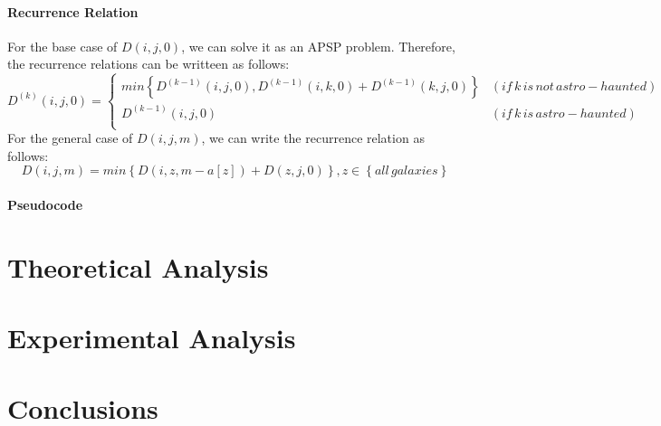 \documentclass{article}
\begin{document}
\paragraph{Recurrence Relation}
For the base case of $D(i,j,0)$, we can solve it as an APSP problem. Therefore, the recurrence relations can be writteen as follows:
$$
D^{\left(k\right)}\left(i,j,0\right) =
\left\{
\begin{aligned}
    min\left\{D^{\left(k-1\right)}\left(i,j,0\right),D^{\left(k-1\right)}\left(i,k,0\right)+D^{\left(k-1\right)}\left(k,j,0\right)\right\} & \left(if\,k\,is\,not\,astro-haunted\right) \\
    D^{\left(k-1\right)}\left(i,j,0\right) & \left(if\,k\,is\,astro-haunted\right) \\
\end{aligned}
\right.
$$
For the general case of $D(i,j,m)$, we can write the recurrence relation as follows:
$$
D\left(i,j,m\right) = min\left\{D\left(i,z,m-a\left[z\right]\right)+D\left(z,j,0\right)\right\},z \in \left\{all\, galaxies\right\}
$$
\paragraph{Pseudocode}

\section{Theoretical Analysis}

\section{Experimental Analysis}

\section{Conclusions}
\end{document}
